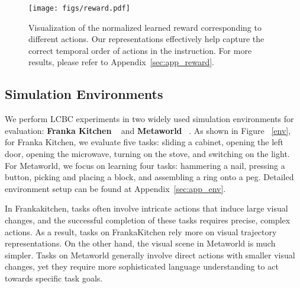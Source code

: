 \begin{figure*}[t]
\begin{center}
\centerline{\texttt{[image: figs/reward.pdf]}}\vspace{-3ex}
\caption{Visualization of the normalized learned reward corresponding to different actions. Our representations effectively help capture the correct temporal order of actions in the instruction. For more results, please refer to  Appendix~\ref{sec:app_reward}.}
\label{fig:reward}
\end{center}
\vskip -0.2in
\end{figure*}


\subsection{Simulation Environments}
We perform LCBC experiments in two widely used simulation environments for evaluation: \textbf{Franka Kitchen} ~\cite{corl19-franka,corr20-franka} and \textbf{Metaworld} ~\cite{corl19-metaworld}. As shown in Figure ~\ref{env}, for Franka Kitchen, we evaluate five tasks: sliding a cabinet, opening the left door, opening the microwave, turning on the stove, and switching on the light. For Metaworld, we focus on learning four tasks: hammering a nail, pressing a button, picking and placing a block, and assembling a ring onto a peg. Detailed environment setup can be found at Appendix~\ref{sec:app_env}.

In Frankakitchen, tasks often involve intricate actions that induce large visual changes, and the successful completion of these tasks requires precise, complex actions. As a result, tasks on FrankaKitchen rely more on visual trajectory representations. On the other hand, the visual scene in Metaworld is much simpler. Tasks on Metaworld generally involve direct actions with smaller visual changes, yet they require more sophisticated language understanding to act towards specific task goals. 


